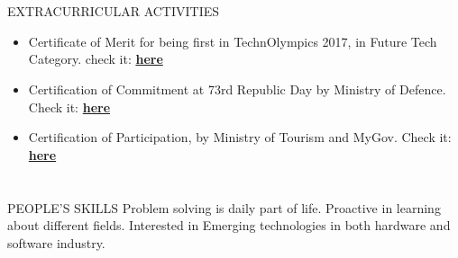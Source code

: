 \documentclass{my_cv}
\begin{document}
\begin{multicols}{2}
\section{\faStar}{EXTRACURRICULAR ACTIVITIES}

\begin{itemize}[noitemsep]
    \item Certificate of Merit for being first in TechnOlympics 2017, in Future Tech Category.
    check it: \textbf{\href{https://drive.google.com/file/d/1RLxo1emzGHALReSLDn7UjfB2_2hTYwOW/view}{here}}
    \item Certification of Commitment at 73rd Republic Day by Ministry of Defence. Check it: \textbf{\href{https://drive.google.com/file/d/19l8o8HjbIlwEPfwosTMTENgxJ1geFbsB/view?usp=sharing}{here}}
    \item Certification of Participation, by Ministry of Tourism and MyGov. Check it: \textbf{\href{https://drive.google.com/file/d/10gOOfH7SBqizZOaP-F6VMnyDdtaQRh1v/view?usp=sharing}{here}}
\end{itemize}

\section{\faSoccerBallO}{PEOPLE'S SKILLS}
Problem solving is daily part of life.
Proactive in learning about different fields.
Interested in Emerging technologies in both hardware and software industry.
\end{multicols}
\end{document}
